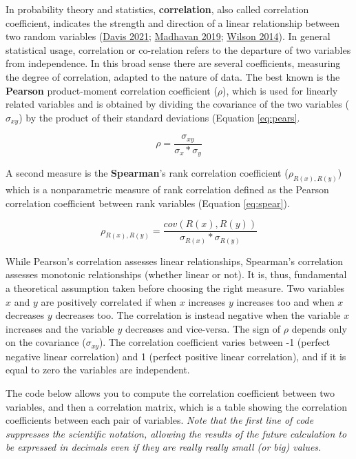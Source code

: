 \documentclass[
]{svmono}
\begin{document}
In probability theory and statistics, \textbf{correlation}, also called
correlation coefficient, indicates the strength and direction of a
linear relationship between two random variables (\protect\hyperlink{ref-davis2021}{Davis 2021}; \protect\hyperlink{ref-madhavan2019}{Madhavan 2019}; \protect\hyperlink{ref-wilson2014}{Wilson 2014}). In general statistical usage, correlation
or co-relation refers to the departure of two variables from
independence. In this broad sense there are several coefficients,
measuring the degree of correlation, adapted to the nature of data. The
best known is the \textbf{Pearson} product-moment correlation coefficient
(\(\rho\)), which is used for linearly related variables and is obtained
by dividing the covariance of the two variables (\(\sigma_{xy}\)) by the
product of their standard deviations (Equation \eqref{eq:pears}.

\begin{equation}
\rho=\frac{\sigma_{xy}}{\sigma_x*\sigma_y}
\label{eq:pears}
\end{equation}

A second measure is the \textbf{Spearman}'s rank correlation coefficient
(\(\rho_{R(x),R(y)}\)) which is a nonparametric measure of rank
correlation defined as the Pearson correlation coefficient between rank
variables (Equation \eqref{eq:spear}).

\begin{equation}
\rho_{R(x),R(y)}=\frac{cov{(R(x),R(y))}}{\sigma_{R(x)}*\sigma_{R(y)}}
\label{eq:spear}
\end{equation}

While Pearson's correlation assesses linear relationships, Spearman's
correlation assesses monotonic relationships (whether linear or not). It
is, thus, fundamental a theoretical assumption taken before choosing the
right measure. Two variables \(x\) and \(y\) are positively correlated if
when \(x\) increases \(y\) increases too and when \(x\) decreases \(y\)
decreases too. The correlation is instead negative when the variable \(x\)
increases and the variable \(y\) decreases and vice-versa. The sign of
\(\rho\) depends only on the covariance (\(\sigma_{xy}\)). The correlation
coefficient varies between -1 (perfect negative linear correlation) and
1 (perfect positive linear correlation), and if it is equal to zero the
variables are independent.

The code below allows you to compute the correlation coefficient between
two variables, and then a correlation matrix, which is a table showing
the correlation coefficients between each pair of variables. \emph{Note that
the first line of code suppresses the scientific notation, allowing the
results of the future calculation to be expressed in decimals even if
they are really really small (or big) values.}
\end{document}
